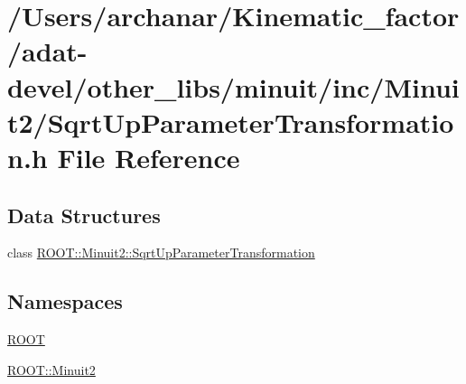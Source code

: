 \hypertarget{adat-devel_2other__libs_2minuit_2inc_2Minuit2_2SqrtUpParameterTransformation_8h}{}\section{/\+Users/archanar/\+Kinematic\+\_\+factor/adat-\/devel/other\+\_\+libs/minuit/inc/\+Minuit2/\+Sqrt\+Up\+Parameter\+Transformation.h File Reference}
\label{adat-devel_2other__libs_2minuit_2inc_2Minuit2_2SqrtUpParameterTransformation_8h}
\subsection*{Data Structures}
\begin{DoxyCompactItemize}
\item 
class \mbox{\hyperlink{classROOT_1_1Minuit2_1_1SqrtUpParameterTransformation}{R\+O\+O\+T\+::\+Minuit2\+::\+Sqrt\+Up\+Parameter\+Transformation}}
\end{DoxyCompactItemize}
\subsection*{Namespaces}
\begin{DoxyCompactItemize}
\item 
 \mbox{\hyperlink{namespaceROOT}{R\+O\+OT}}
\item 
 \mbox{\hyperlink{namespaceROOT_1_1Minuit2}{R\+O\+O\+T\+::\+Minuit2}}
\end{DoxyCompactItemize}
